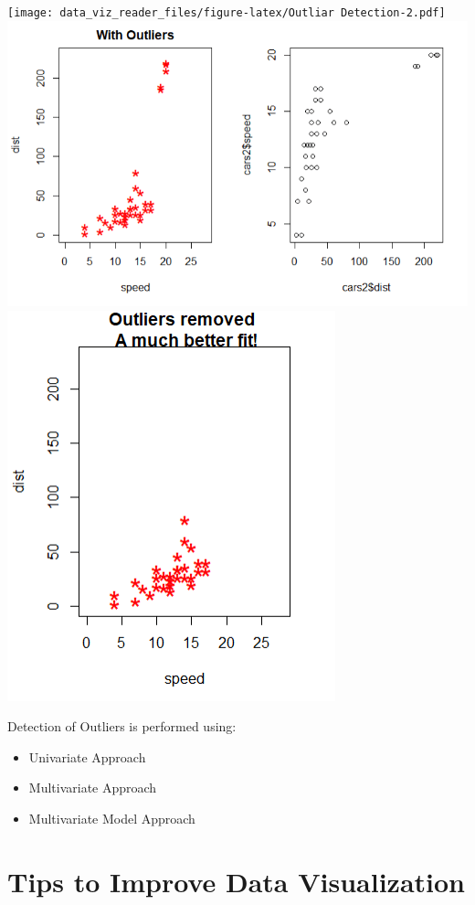 \documentclass[]{book}
\providecommand{\tightlist}{%
  \setlength{\itemsep}{0pt}\setlength{\parskip}{0pt}}
\theoremstyle{definition}
\theoremstyle{definition}
\theoremstyle{definition}
\theoremstyle{remark}
\begin{document}
\texttt{[image: data\_viz\_reader\_files/figure-latex/Outliar Detection-2.pdf]}
\includegraphics{images/with_outliers.png}
\includegraphics{images/outliers_removed.png}

Detection of Outliers is performed using:

\begin{itemize}
\tightlist
\item
  Univariate Approach
\item
  Multivariate Approach
\item
  Multivariate Model Approach
\end{itemize}

\section{Tips to Improve Data
Visualization}\label{tips-to-improve-data-visualization}
\end{document}
